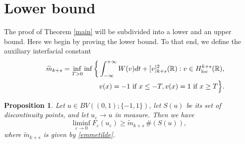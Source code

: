 \documentclass{article}
\newtheorem{proposition}[lemma]{Proposition}
\newcommand{\e}{\varepsilon}
\begin{document}
\section{Lower bound} 
The proof of Theorem \ref{main} will be subdivided into a lower and an upper bound. Here we begin by proving the lower bound. To that end, we define the auxiliary interfacial constant
\begin{eqnarray}\label{emmetilde}\nonumber
&&\widetilde m_{k+s}=\inf_{T>0} \inf\bigg\{\int_{-\infty}^{+\infty} W(v)dt + [v]^2_{k+s}(\mathbb R): v\in H^{k+s}_{\rm loc} (\mathbb R), \\
&&\hskip3cm v(x)=-1\hbox{ \rm if }x\le -T,v(x)=1\hbox{ \rm if }x\ge T\Big\}.
\end{eqnarray}


\begin{proposition}\label{lo-bo} Let $u\in BV((0,1);\{-1,1\})$, let $S(u)$ be its set of discontinuity points, and let $u_\e\to u$ in measure. Then we have
\begin{equation}
\liminf_{\e\to 0} F_\e(u_\e)\ge \widetilde m_{k+s}\,\#(S(u)),
\end{equation}
where $\widetilde m_{k+s}$ is given by \eqref{emmetilde}.
\end{proposition}
\end{document}

